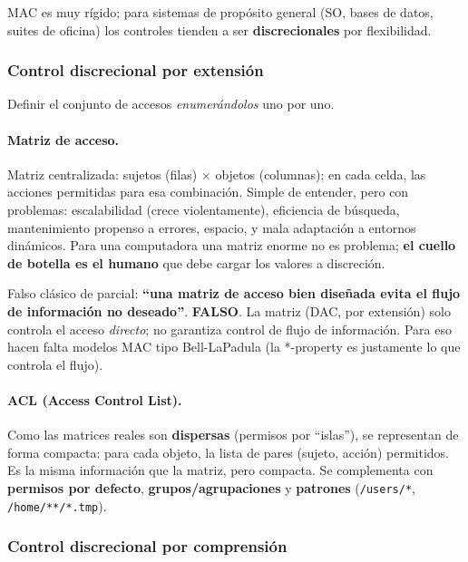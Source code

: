 \documentclass[../main.tex]{subfiles}
\begin{document}
MAC es muy rígido; para sistemas de propósito general (SO, bases de datos, suites de oficina) los controles tienden a ser \textbf{discrecionales} por flexibilidad.

\subsubsection{Control discrecional por extensión}

Definir el conjunto de accesos \emph{enumerándolos} uno por uno.

\paragraph{Matriz de acceso.} Matriz centralizada: sujetos (filas) $\times$ objetos (columnas); en cada celda, las acciones permitidas para esa combinación. Simple de entender, pero con problemas: escalabilidad (crece violentamente), eficiencia de búsqueda, mantenimiento propenso a errores, espacio, y mala adaptación a entornos dinámicos. Para una computadora una matriz enorme no es problema; \textbf{el cuello de botella es el humano} que debe cargar los valores a discreción.

\begin{ojo}
Falso clásico de parcial: \textbf{``una matriz de acceso bien diseñada evita el flujo de información no deseado''}. \textbf{FALSO}. La matriz (DAC, por extensión) solo controla el acceso \emph{directo}; no garantiza control de flujo de información. Para eso hacen falta modelos MAC tipo Bell-LaPadula (la *-property es justamente lo que controla el flujo).
\end{ojo}

\paragraph{ACL (Access Control List).} Como las matrices reales son \textbf{dispersas} (permisos por ``islas''), se representan de forma compacta: para cada objeto, la lista de pares (sujeto, acción) permitidos. Es la misma información que la matriz, pero compacta. Se complementa con \textbf{permisos por defecto}, \textbf{grupos/agrupaciones} y \textbf{patrones} (\texttt{/users/*}, \texttt{/home/**/*.tmp}).

\subsubsection{Control discrecional por comprensión}
\end{document}

